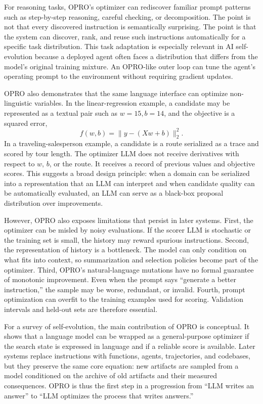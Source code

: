 For reasoning tasks, OPRO's optimizer can rediscover familiar prompt patterns such as step-by-step reasoning, careful checking, or decomposition.  The point is not that every discovered instruction is semantically surprising.  The point is that the system can discover, rank, and reuse such instructions automatically for a specific task distribution.  This task adaptation is especially relevant in AI self-evolution because a deployed agent often faces a distribution that differs from the model's original training mixture.  An OPRO-like outer loop can tune the agent's operating prompt to the environment without requiring gradient updates.

OPRO also demonstrates that the same language interface can optimize non-linguistic variables.  In the linear-regression example, a candidate may be represented as a textual pair such as $w=15, b=14$, and the objective is a squared error,
\begin{equation}
  f(w,b) = \lVert y - (Xw+b)\rVert_2^2.
\end{equation}
In a traveling-salesperson example, a candidate is a route serialized as a trace and scored by tour length.  The optimizer LLM does not receive derivatives with respect to $w$, $b$, or the route.  It receives a record of previous values and objective scores.  This suggests a broad design principle: when a domain can be serialized into a representation that an LLM can interpret and when candidate quality can be automatically evaluated, an LLM can serve as a black-box proposal distribution over improvements.

However, OPRO also exposes limitations that persist in later systems.  First, the optimizer can be misled by noisy evaluations.  If the scorer LLM is stochastic or the training set is small, the history may reward spurious instructions.  Second, the representation of history is a bottleneck.  The model can only condition on what fits into context, so summarization and selection policies become part of the optimizer.  Third, OPRO's natural-language mutations have no formal guarantee of monotonic improvement.  Even when the prompt says ``generate a better instruction,'' the sample may be worse, redundant, or invalid.  Fourth, prompt optimization can overfit to the training examples used for scoring.  Validation intervals and held-out sets are therefore essential.

For a survey of self-evolution, the main contribution of OPRO is conceptual.  It shows that a language model can be wrapped as a general-purpose optimizer if the search state is expressed in language and if a reliable score is available.  Later systems replace instructions with functions, agents, trajectories, and codebases, but they preserve the same core equation: new artifacts are sampled from a model conditioned on the archive of old artifacts and their measured consequences.  OPRO is thus the first step in a progression from ``LLM writes an answer'' to ``LLM optimizes the process that writes answers.''

